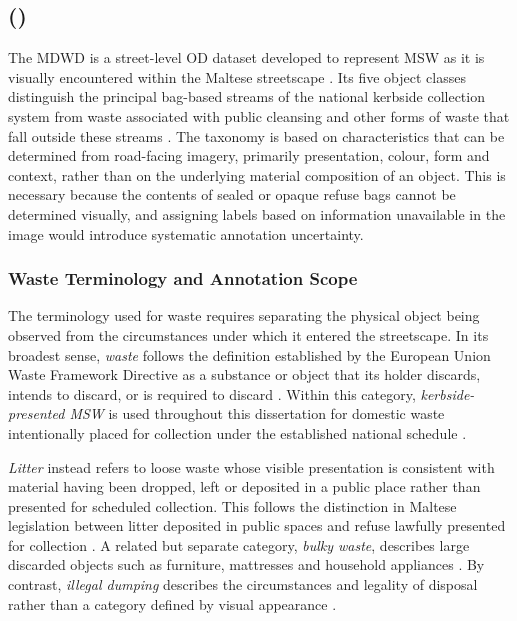 \subsection{ ()}
\label{sec:bg-mdwd}
The \gls{MDWD} is a street-level \gls{OD} dataset developed to represent \gls{MSW} as it is visually encountered within the Maltese streetscape \cite{BG15-mdwd}. Its five object classes distinguish the principal bag-based streams of the national kerbside collection system from waste associated with public cleansing and other forms of waste that fall outside these streams \cite{BG15-mdwd,wastecollection2026web}. The taxonomy is based on characteristics that can be determined from road-facing imagery, primarily presentation, colour, form and context, rather than on the underlying material composition of an object. This is necessary because the contents of sealed or opaque refuse bags cannot be determined visually, and assigning labels based on information unavailable in the image would introduce systematic annotation uncertainty.

\subsubsection{Waste Terminology and Annotation Scope}
\label{sec:bg-waste-term}
The terminology used for waste requires separating the physical object being observed from the circumstances under which it entered the streetscape. In its broadest sense, \emph{waste} follows the definition established by the European Union Waste Framework Directive as a substance or object that its holder discards, intends to discard, or is required to discard \cite{BG23-waste-framework}. Within this category, \emph{kerbside-presented \gls{MSW}} is used throughout this dissertation for domestic waste intentionally placed for collection under the established national schedule \cite{wastecollection2026web}.

\emph{Litter} instead refers to loose waste whose visible presentation is consistent with material having been dropped, left or deposited in a public place rather than presented for scheduled collection. This follows the distinction in Maltese legislation between litter deposited in public spaces and refuse lawfully presented for collection \cite{BG24-malta-litter}. A related but separate category, \emph{bulky waste}, describes large discarded objects such as furniture, mattresses and household appliances \cite{BG25-bulky-waste}. By contrast, \emph{illegal dumping} describes the circumstances and legality of disposal rather than a category defined by visual appearance \cite{BG26-illegal-disposal}.

